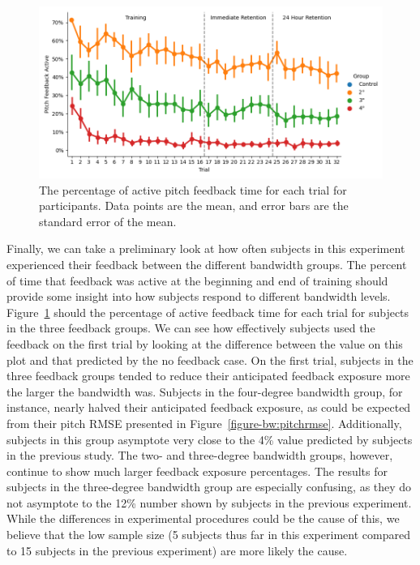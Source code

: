 \begin{figure}[tb!]
    \begin{center}
        \includegraphics[width=\linewidth]{figures/Aircraft/Bandwidth-PitchFeedbackOn.png}
        \caption[The mean percentage of active pitch feedback time for each trial]{The percentage of active pitch feedback time for each trial for participants. Data points are the mean, and error bars are the standard error of the mean.}
        \label{figure-bw:pitchfeedback}
    \end{center}
\end{figure}

Finally, we can take a preliminary look at how often subjects in this experiment experienced their feedback between the different bandwidth groups.
The percent of time that feedback was active at the beginning and end of training should provide some insight into how subjects respond to different bandwidth levels.
Figure~\ref{figure-bw:pitchfeedback} should the percentage of active feedback time for each trial for subjects in the three feedback groups.
We can see how effectively subjects used the feedback on the first trial by looking at the difference between the value on this plot and that predicted by the no feedback case.
On the first trial, subjects in the three feedback groups tended to reduce their anticipated feedback exposure more the larger the bandwidth was.
Subjects in the four-degree bandwidth group, for instance, nearly halved their anticipated feedback exposure, as could be expected from their pitch RMSE presented in Figure~\ref{figure-bw:pitchrmse}.
Additionally, subjects in this group asymptote very close to the 4\% value predicted by subjects in the previous study.
The two- and three-degree bandwidth groups, however, continue to show much larger feedback exposure percentages.
The results for subjects in the three-degree bandwidth group are especially confusing, as they do not asymptote to the 12\% number shown by subjects in the previous experiment.
While the differences in experimental procedures could be the cause of this, we believe that the low sample size (5 subjects thus far in this experiment compared to 15 subjects in the previous experiment) are more likely the cause.

